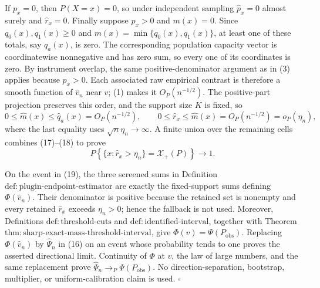 If \(p_x=0\), then \(P(X=x)=0\), so under independent sampling \(\widehat p_x=0\) almost surely and \(\widehat r_x=0\).  Finally suppose \(p_x>0\) and \(m(x)=0\).  Since \(q_0(x),q_1(x)\ge0\) and \(m(x)=\min\{q_0(x),q_1(x)\}\), at least one of these totals, say \(q_a(x)\), is zero.  The corresponding population capacity vector is coordinatewise nonnegative and has zero sum, so every one of its coordinates is zero.  By instrument overlap, the same positive-denominator argument as in (3) applies because \(p_x>0\).  Each associated raw empirical contrast is therefore a smooth function of \(\widehat v_n\) near \(v\); (1) makes it \(O_P(n^{-1/2})\).  The positive-part projection preserves this order, and the support size \(K\) is fixed, so
\[
0\le\widehat m(x)\le\widehat q_a(x)=O_P(n^{-1/2}),
\qquad
0\le\widehat r_x\le\widehat m(x)=O_P(n^{-1/2})=o_P(\eta_n),
\tag{18}
\]
where the last equality uses \(\sqrt n\eta_n\to\infty\).  A finite union over the remaining cells combines (17)--(18) to prove
\[
P\!\left\{\{x:\widehat r_x>\eta_n\}=\mathcal X_+(P)\right\}\longrightarrow1.
\tag{19}
\]

On the event in (19), the three screened sums in Definition \(\mathrm{def{:}plugin\text{-}endpoint\text{-}estimator}\) are exactly the fixed-support sums defining \(\Phi(\widehat v_n)\).  Their denominator is positive because the retained set is nonempty and every retained \(\widehat r_x\) exceeds \(\eta_n>0\); hence the fallback is not used.  Moreover, Definitions \(\mathrm{def{:}threshold\text{-}cuts}\) and \(\mathrm{def{:}identified\text{-}interval}\), together with Theorem \(\mathrm{thm{:}sharp\text{-}exact\text{-}mass\text{-}threshold\text{-}interval}\), give \(\Phi(v)=\Psi(P_{\mathrm{obs}})\).  Replacing \(\Phi(\widehat v_n)\) by \(\widehat\Psi_n\) in (16) on an event whose probability tends to one proves the asserted directional limit.  Continuity of \(\Phi\) at \(v\), the law of large numbers, and the same replacement prove \(\widehat\Psi_n\to_P\Psi(P_{\mathrm{obs}})\).  No direction-separation, bootstrap, multiplier, or uniform-calibration claim is used. \(\square\)